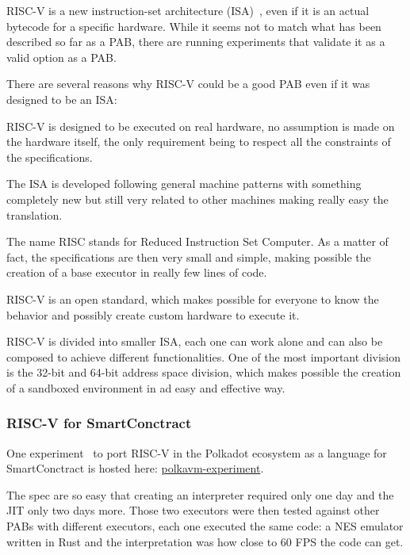\documentclass[../main.tex]{subfiles}
\begin{document}
RISC-V is a new instruction-set architecture (ISA)~\cite{risc-v-spec}, even if it is an actual bytecode for a specific hardware. While it seems not to match what has been described so far as a PAB, there are running experiments that validate it as a valid option as a PAB.

There are several reasons why RISC-V could be a good PAB even if it was designed to be an ISA:
\begin{description}[style=nextline]
  \item[Real ISA suitable for direct native hardware implementation]
        RISC-V is designed to be executed on real hardware, no assumption is made on the hardware itself, the only requirement being to respect all the constraints of the specifications.
        
        The ISA is developed following general machine patterns with something completely new but still very related to other machines making really easy the translation.

  \item[RISC]
        The name RISC stands for Reduced Instruction Set Computer. As a matter of fact, the specifications are then very small and simple, making possible the creation of a base executor in really few lines of code.
  \item[Completely open ISA]
        RISC-V is an open standard, which makes possible for everyone to know the behavior and possibly create custom hardware to execute it.
  \item[ISA separated into a small base integer ISA]
        RISC-V is divided into smaller ISA, each one can work alone and can also be composed to achieve different functionalities. One of the most important division is the 32-bit and 64-bit address space division, which makes possible the creation of a sandboxed environment in ad easy and effective way.
\end{description}

\subsubsection{RISC-V for SmartConctract}

One experiment~\cite{polkavm-forum} to port RISC-V in the Polkadot ecosystem as a language for SmartConctract is hosted here: \href{https://github.com/koute/polkavm-experiment}{polkavm-experiment}.

The spec are so easy that creating an interpreter required only one day and the JIT only two days more. Those two executors were then tested against other PABs with different executors, each one executed the same code: a NES emulator written in Rust and the interpretation was how close to 60 FPS the code can get.
\end{document}
